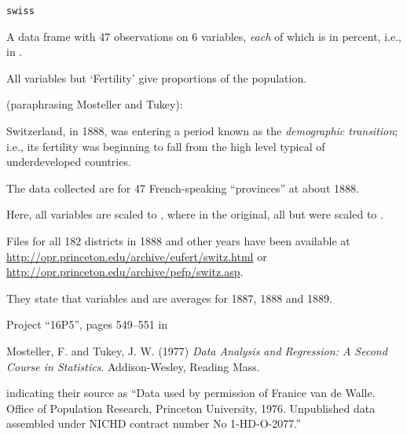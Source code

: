 %
\begin{Usage}
\begin{verbatim}
swiss
\end{verbatim}
\end{Usage}
%
\begin{Format}
A data frame with 47 observations on 6 variables, \emph{each} of which
is in percent, i.e., in \eqn{[0, 100]}{}.



All variables but `Fertility' give proportions of the
population.
\end{Format}
%
\begin{Details}\relax
(paraphrasing Mosteller and Tukey):

Switzerland, in 1888, was entering a period known as the
\emph{demographic transition}; i.e., its fertility was beginning to
fall from the high level typical of underdeveloped countries.

The data collected are for 47 French-speaking ``provinces'' at
about 1888.

Here, all variables are scaled to \eqn{[0, 100]}{}, where in the
original, all but  were scaled to \eqn{[0, 1]}{}.
\end{Details}
%
\begin{Note}\relax
Files for all 182 districts in 1888 and other years have been available at
\url{http://opr.princeton.edu/archive/eufert/switz.html} or
\url{http://opr.princeton.edu/archive/pefp/switz.asp}.

They state that variables  and 
are averages for 1887, 1888 and 1889.
\end{Note}
%
\begin{Source}\relax
Project ``16P5'', pages 549--551 in

Mosteller, F. and Tukey, J. W. (1977)
\emph{Data Analysis and Regression: A Second Course in Statistics}.
Addison-Wesley, Reading Mass.

indicating their source as
``Data used by permission of Franice van de Walle. Office of
Population Research, Princeton University, 1976.  Unpublished data
assembled under NICHD contract number No 1-HD-O-2077.''
\end{Source}

